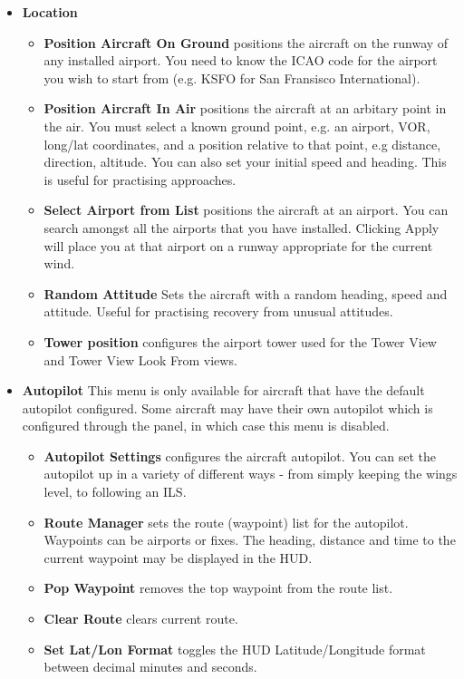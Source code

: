 \begin{itemize}
\item \textbf{Location}
 \begin{itemize}
   \item \textbf{Position Aircraft On Ground} positions the aircraft
   on the runway of any installed airport. You need to know the ICAO code for
the airport you wish to start from (e.g. KSFO for San Fransisco International).
   \item \textbf{Position Aircraft In Air} positions the aircraft at
   an arbitary point in the air. You must select a known ground point, e.g. an
airport, VOR, long/lat
   coordinates, and a position relative to that point, e.g distance, direction,
altitude. You can also
   set your initial speed and heading. This is useful for practising approaches.
   \item \textbf{Select Airport from List} positions the aircraft at an airport.
You can search amongst all the airports that you have installed.
Clicking Apply will place you at that airport on a runway appropriate for the current wind.
   \item \textbf{Random Attitude} Sets the aircraft with a random heading, speed
and attitude. Useful for practising recovery from unusual attitudes.
   \item \textbf{Tower position} configures the airport tower used for the Tower
   View and Tower View Look From views.
 \end{itemize}

\item \textbf{Autopilot} This menu is only available for
aircraft that have the default
autopilot configured. Some aircraft may have their own autopilot which is
configured through the panel, in which case this menu is disabled.
 \begin{itemize}

   \item \textbf{Autopilot Settings} configures the aircraft autopilot.
   You can set the autopilot up in a variety of different ways - from simply
keeping the wings level, to following an ILS.
  \item \textbf{Route Manager} sets the route (waypoint) list for the autopilot.
Waypoints can be airports or fixes. The heading, distance and time to the
current waypoint may be displayed in the HUD.
  \item \textbf{Pop Waypoint} removes the top waypoint from the route list.
 \item \textbf{Clear Route} clears current route.
  \item \textbf{Set Lat/Lon Format} toggles the HUD Latitude/Longitude format
between decimal minutes and seconds.
 \end{itemize}


\end{itemize}
